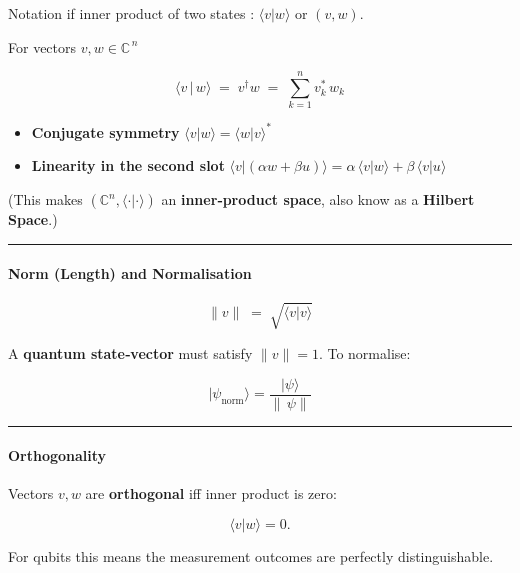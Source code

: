 Notation if inner product of two states : \(\langle v | w \rangle\) or
\((v,w)\).

For vectors \(v,w\in\mathbb C^{\,n}\)

\[
\boxed{\;
\langle v \,|\, w\rangle \;=\; v^{\dagger} w
\;=\; \sum_{k=1}^{n} v_k^{\!*}\,w_k
\;}
\]

\begin{itemize}
\tightlist
\item
  \textbf{Conjugate
  symmetry} \(\langle v|w\rangle = \langle w|v\rangle^{*}\)\\
\item
  \textbf{Linearity in the second
  slot} \(\langle v|(\alpha w+\beta u)\rangle = \alpha\,\langle v|w\rangle+\beta\,\langle v|u\rangle\)
\end{itemize}

(This makes \((\mathbb C^{n},\langle\cdot|\cdot\rangle)\) an
\textbf{inner‑product space}, also know as a \textbf{Hilbert Space}.)

\begin{center}\rule{0.5\linewidth}{0.5pt}\end{center}

\hypertarget{norm-length-and-normalisation}{%
\paragraph{Norm (Length) and
Normalisation}\label{norm-length-and-normalisation}}

\[
\|v\| \;=\; \sqrt{\langle v|v\rangle}
\]

A \textbf{quantum state‑vector} must satisfy \(\|v\|=1\). To normalise:

\[
\lvert\psi_{\text{norm}}\rangle = \frac{\lvert\psi\rangle}{\|\,\psi\|}
\]

\begin{center}\rule{0.5\linewidth}{0.5pt}\end{center}

\hypertarget{orthogonality}{%
\paragraph{Orthogonality}\label{orthogonality}}

Vectors \(v,w\) are \textbf{orthogonal} iff inner product is zero:

\[
\langle v | w\rangle = 0 .
\]

For qubits this means the measurement outcomes are perfectly
distinguishable.

